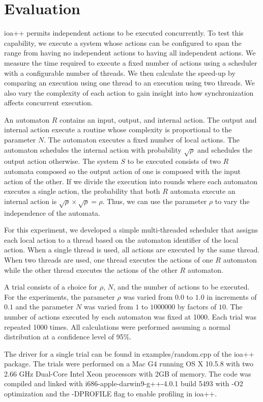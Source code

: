 \section{Evaluation\label{evaluation}}

ioa++ permits independent actions to be executed concurrently.
To test this capability, we execute a system whose actions can be configured to span the range from having no independent actions to having all independent actions.
We measure the time required to execute a fixed number of actions using a scheduler with a configurable number of threads.
We then calculate the speed-up by comparing an execution using one thread to an execution using two threads.
We also vary the complexity of each action to gain insight into how synchronization affects concurrent execution.

An automaton $R$ contains an input, output, and internal action.
The output and internal action execute a routine whose complexity is proportional to the parameter $N$.
The automaton executes a fixed number of local actions.
The automaton schedules the internal action with probability $\sqrt{\rho}$ and schedules the output action otherwise.
The system $S$ to be executed consists of two $R$ automata composed so the output action of one is composed with the input action of the other.
If we divide the execution into rounds where each automaton executes a single action, the probability that both $R$ automata execute an internal action is $\sqrt{\rho} \times \sqrt{\rho} = \rho$.
Thus, we can use the parameter $\rho$ to vary the independence of the automata.

For this experiment, we developed a simple multi-threaded scheduler that assigns each local action to a thread based on the automaton identifier of the local action.
When a single thread is used, all actions are executed by the same thread.
When two threads are used, one thread executes the actions of one $R$ automaton while the other thread executes the actions of the other $R$ automaton.

A trial consists of a choice for $\rho$, $N$, and the number of actions to be executed.
For the experiments, the parameter $\rho$ was varied from $0.0$ to $1.0$ in increments of $0.1$ and the parameter $N$ was varied from $1$ to $1000000$ by factors of $10$.
The number of actions executed by each automaton was fixed at 1000.
Each trial was repeated 1000 times.
All calculations were performed assuming a normal distribution at a confidence level of 95\%.

The driver for a single trial can be found in examples/random.cpp of the ioa++ package.
The trials were performed on a Mac G4 running OS X 10.5.8 with two 2.66 GHz Dual-Core Intel Xeon processors with 2GB of memory.
The code was compiled and linked with i686-apple-darwin9-g++-4.0.1 build 5493 with -O2 optimization and the -DPROFILE flag to enable profiling in ioa++.


